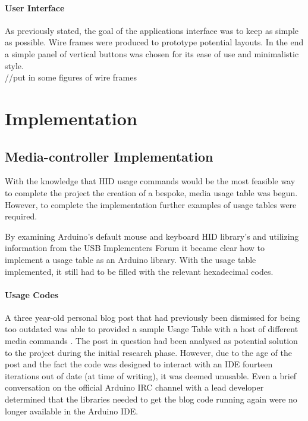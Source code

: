 \documentclass{article}
\begin{document}
			\paragraph{User Interface}
			As previously stated, the goal of the applications interface was to keep as simple as possible. Wire frames were produced to prototype potential layouts. In the end a simple panel of vertical buttons was chosen for its ease of use and minimalistic style.\\
			
			\noindent
			//put in some figures of wire frames

	\section{Implementation}
		\subsection{Media-controller Implementation}
			With the knowledge that HID usage commands would be the most feasible way to complete the project the creation of a bespoke, media usage table was begun. However, to complete the implementation further examples of usage tables were required.
			
			By examining Arduino's default mouse and keyboard HID library's \cite{ArduinoGit:online} and utilizing information from the USB Implementers Forum \cite{USBHID:online} it became clear how to implement a usage table as an Arduino library. With the usage table implemented, it still had to be filled with the relevant hexadecimal codes.
				
			\paragraph{Usage Codes}
			A three year-old personal blog post that had previously been dismissed for being too outdated was able to provided a sample Usage Table with a host of different media commands \cite{MediaBlog:online}. The post in question had been analysed as potential solution to the project during the initial research phase. However, due to the age of the post and the fact the code was designed to interact with an IDE fourteen iterations out of date (at time of writing), it was deemed unusable. Even a brief conversation on the official Arduino IRC channel with a lead developer determined that the libraries needed to get the blog code running again were no longer available in the Arduino IDE.
					
\end{document}

